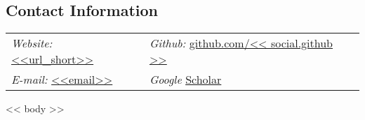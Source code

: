 \documentclass[margin,line]{res}
\begin{document}
\newcommand{\wilka}{{\bf{\color{nice_purple}Wilka Carvalho}}}

\begin{resume}

\section{\sc Contact Information}
  \vspace{.05in}
  \begin{tabular}{@{}p{4in}p{4in}}
    {\it Website:} \href{<<url>>}{\color{links}<<url_short>>} & {\it Github:}  \href{https://github.com/<< social.github >>}{\color{links}github.com/<< social.github >>} \\
    {\it E-mail:} \href{mailto:<<email>>}{\color{links}<<email>>} & {\it Google}  \href{https://scholar.google.com/citations?user=<<social.google_scholar>>&hl=en}{\color{links}Scholar} 
  \end{tabular}

<< body >>

\end{resume}
\end{document}
